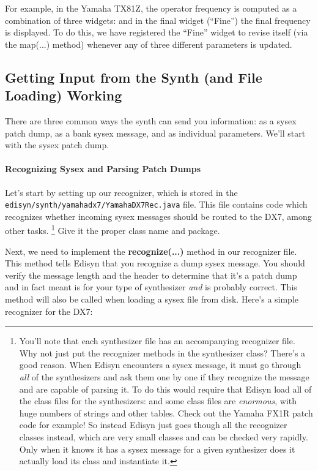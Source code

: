 \documentclass{article}
\begin{document}
For example, in the Yamaha TX81Z, the operator frequency is computed as a combination of three widgets: and in the final widget (``Fine'') the final frequency is displayed.  To do this, we have registered the ``Fine'' widget to revise itself (via the map(...) method) whenever any of three different parameters is updated.

\subsection{Getting Input from the Synth (and File Loading) Working}
\label{filereading}

There are three common ways the synth can send you information: as a sysex patch dump, as a bank sysex message, and as individual parameters.  We'll start with the sysex patch dump.

\paragraph{Recognizing Sysex and Parsing Patch Dumps}
Let's start by setting up our recognizer, which is stored in the {\tt edisyn/synth/yamahadx7/YamahaDX7Rec.java} file.  This file contains code which recognizes whether incoming sysex messages should be routed to the DX7, among other tasks.  \footnote{You'll note that each synthesizer file has an accompanying recognizer file.  Why not just put the recognizer methods in the synthesizer class?  There's a good reason.  When Edisyn encounters a sysex message, it must go through {\it all} of the synthesizers and ask them one by one if they recognize the message and are capable of parsing it.  To do this would require that Edisyn load all of the class files for the synthesizers: and some class files are {\it enormous}, with huge numbers of strings and other tables.  Check out the Yamaha FX1R patch code for example!  So instead Edisyn just goes though all the recognizer classes instead, which are very small classes and can be checked very rapidly.  Only when it knows it has a sysex message for a given synthesizer does it actually load its class and instantiate it.}   Give it the proper class name and package.

Next, we need to implement the {\bf recognize(...)} method in our recognizer file.  This method tells Edisyn that you recognize a dump sysex message.  You should verify the message length and the header to determine that it's a patch dump and in fact meant is for your type of synthesizer {\it and} is probably correct.  This method will also be called when loading a sysex file from disk.  Here's a simple recognizer for the DX7:
\end{document}
